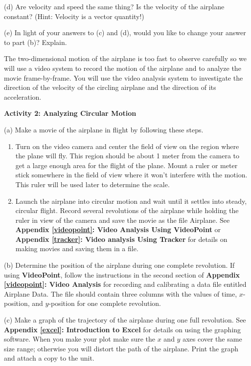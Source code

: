 (d) Are velocity and speed the same thing? Is the velocity of the airplane constant?
(Hint: Velocity is a vector quantity!)
\vspace{20mm}

(e) In light of your answers to (c) and (d), would you like to change your answer
to part (b)? Explain.
\vspace{20mm}

The two-dimensional motion of the airplane is too fast to observe carefully
so we will use a video system to record the motion of the airplane and to analyze
the movie frame-by-frame. You will use the video analysis system to investigate
the direction of the velocity of the circling airplane and the direction of
its acceleration.

\textbf{Activity 2: Analyzing Circular Motion }

(a) Make a movie of the airplane in flight by following these steps. 

\begin{enumerate}
\item Turn on the video camera and center the field of view on the region where the
plane will fly. This region should be about 1 meter from the camera to get a
large enough area for the flight of the plane. Mount a ruler or meter stick
somewhere in the field of view where it won't interfere with the motion. This
ruler will be used later to determine the scale. 
\item Launch the airplane into circular motion and wait until it settles into steady,
circular flight. Record several revolutions of the airplane while holding the
ruler in view of the camera and save the movie as the file Airplane. See \textbf{Appendix \ref{videopoint}: Video Analysis Using VideoPoint} or \textbf{Appendix \ref{tracker}: Video analysis Using Tracker} for details on making movies and saving them in a file.
\end{enumerate}
(b) Determine the position of the airplane during one complete revolution. If using \textbf{VideoPoint}, follow the instructions in the second section of \textbf{Appendix
\ref{videopoint}: Video Analysis} for recording and calibrating a data file entitled Airplane
Data. The file should contain three columns with the values of time, $x$-position, and $y$-position for one complete revolution.

(c) Make a graph of the trajectory of the airplane during one full revolution.
See \textbf{Appendix \ref{excel}: Introduction to Excel} for details on using
the graphing software. When you make your plot make sure the $x$ and $y$ 
axes cover
the same size range; otherwise you will distort the path of the airplane. Print
the graph and attach a copy to the unit.

